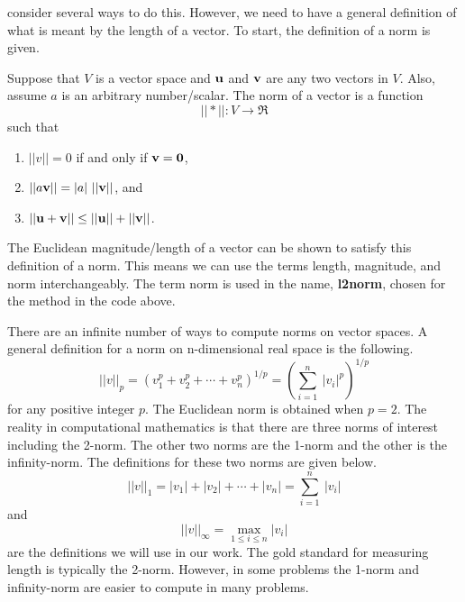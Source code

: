 \documentclass[10pt,fleqn]{article}
\begin{document}
consider several ways to do this. However, we need to have a general definition
of what is meant by the length of a vector. To start, the definition of a norm
is given.
\begin{definition}
   Suppose that $V$ is a vector space and ${\bf u}$ and ${\bf v}$ are any two
   vectors in $V$. Also, assume $a$ is an arbitrary number/scalar. The norm of a
   vector is a function
   $$
     || * || : V \rightarrow \Re
   $$
   such that
   \begin{enumerate}
     \item $||v||=0$ if and only if ${\bf v} = {\bf 0}$,
     \item $||a{\bf v}|| = |a|\ ||{\bf v}||$, and
     \item $||{\bf u} + {\bf v} || \leq ||{\bf u}|| + ||{\bf v}||$.
   \end{enumerate}
\end{definition}
The Euclidean magnitude/length of a vector can be shown to satisfy this
definition of a norm. This means we can use the terms length, magnitude, and
norm interchangeably. The term norm is used in the name, {\bf l2norm}, chosen
for the method in the code above.

There are an infinite number of ways to compute norms on vector spaces. A
general definition for a norm on n-dimensional real space is the following.
$$
  ||v||_p = \left( v_1^p + v_2^p + \cdots + v_n^p \right)^{1/p}
              = \left( \sum_{i=1}^n\ |v_i|^p \right)^{1/p}
$$
for any positive integer $p$. The Euclidean norm is obtained when $p=2$. The
reality in computational mathematics is that there are three norms of interest
including the 2-norm. The other two norms are the 1-norm and the other is the
infinity-norm.  The definitions for these two norms are given below.
$$
  ||v||_1 = | v_1 | + | v_2 | + \cdots + | v_n | = \sum_{i=1}^n\ |v_i|
$$
and
$$
  ||v||_\infty = \max_{1\leq i\leq n} | v_i | 
$$
are the definitions we will use in our work. The gold standard for measuring
length is typically the 2-norm. However, in some problems the 1-norm and
infinity-norm are easier to compute in many problems.
\end{document}
